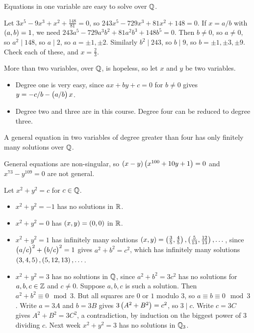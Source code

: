 Equations in one variable are easy to solve over $ \mathbb{Q} $.

\begin{example*}
Let $ 3x^5 - 9x^3 + x^2 + \tfrac{148}{81} = 0 $, so $ 243x^5 - 729x^3 + 81x^2 + 148 = 0 $. If $ x = a / b $ with $ \br{a, b} = 1 $, we need $ 243a^5 - 729a^3b^2 + 81a^2b^3 + 148b^5 = 0 $. Then $ b \ne 0 $, so $ a \ne 0 $, so $ a^2 \mid 148 $, so $ a \mid 2 $, so $ a = \pm 1, \pm 2 $. Similarly $ b^2 \mid 243 $, so $ b \mid 9 $, so $ b = \pm 1, \pm 3, \pm 9 $. Check each of these, and $ x = \tfrac{2}{3} $.
\end{example*}

More than two variables, over $ \mathbb{Q} $, is hopeless, so let $ x $ and $ y $ be two variables.
\begin{itemize}
\item Degree one is very easy, since $ ax + by + c = 0 $ for $ b \ne 0 $ gives $ y = -c / b - \br{a / b}x $.
\item Degree two and three are in this course. Degree four can be reduced to degree three.
\end{itemize}

\begin{theorem}
A general equation in two variables of degree greater than four has only finitely many solutions over $ \mathbb{Q} $.
\end{theorem}

General equations are non-singular, so $ \br{x - y}\br{x^{100} + 10y + 1} = 0 $ and $ x^{73} - y^{109} = 0 $ are not general.

\begin{example}
Let $ x^2 + y^2 = c $ for $ c \in \mathbb{Q} $.
\begin{itemize}
\item $ x^2 + y^2 = -1 $ has no solutions in $ \mathbb{R} $.
\item $ x^2 + y^2 = 0 $ has $ \br{x, y} = \br{0, 0} $ in $ \mathbb{R} $.
\item $ x^2 + y^2 = 1 $ has infinitely many solutions $ \br{x, y} = \br{\tfrac{3}{5}, \tfrac{4}{5}}, \br{\tfrac{5}{13}, \tfrac{12}{13}}, \dots $, since $ \br{a / c}^2 + \br{b / c}^2 = 1 $ gives $ a^2 + b^2 = c^2 $, which has infinitely many solutions $ \br{3, 4, 5}, \br{5, 12, 13}, \dots $.
\item $ x^2 + y^2 = 3 $ has no solutions in $ \mathbb{Q} $, since $ a^2 + b^2 = 3c^2 $ has no solutions for $ a, b, c \in \mathbb{Z} $ and $ c \ne 0 $. Suppose $ a, b, c $ is such a solution. Then $ a^2 + b^2 \equiv 0 \mod 3 $. But all squares are $ 0 $ or $ 1 $ modulo $ 3 $, so $ a \equiv b \equiv 0 \mod 3 $. Write $ a = 3A $ and $ b = 3B $ gives $ 3\br{A^2 + B^2} = c^2 $, so $ 3 \mid c $. Write $ c = 3C $ gives $ A^2 + B^2 = 3C^2 $, a contradiction, by induction on the biggest power of $ 3 $ dividing $ c $. Next week $ x^2 + y^2 = 3 $ has no solutions in $ \mathbb{Q}_3 $.
\end{itemize}
\end{example}

